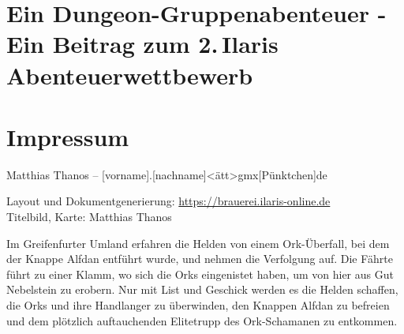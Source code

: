 \begin{centering}
\section*{Ein Dungeon-Gruppenabenteuer - Ein Beitrag zum 2.\,Ilaris Abenteuerwettbewerb}


\platz

\section*{Impressum}

\end{centering}

{Matthias Thanos -- [vorname].[nachname]<ätt>gmx[Pünktchen]de}





{%
Layout und Dokumentgenerierung: \url{https://brauerei.ilaris-online.de} \\
Titelbild, Karte: Matthias Thanos}

\neueseite

\spaltenanfang



Im Greifenfurter Umland erfahren die Helden von einem Ork-Überfall, bei dem der Knappe Alfdan entführt wurde, und nehmen die Verfolgung auf. Die Fährte führt zu einer Klamm, wo sich die Orks eingenistet haben, um von hier aus Gut Nebelstein zu erobern. Nur mit List und Geschick werden es die Helden schaffen, die Orks und ihre Handlanger zu überwinden, den Knappen Alfdan zu befreien und dem plötzlich auftauchenden Elitetrupp des Ork-Schamanen zu entkommen.



